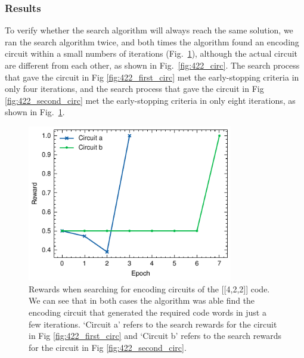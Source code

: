 \documentclass[a4paper,onecolumn,11pt]{quantumarticle}
\begin{document}
\subsubsection{Results}
To verify whether the search algorithm will always reach the same solution, we ran the search algorithm twice, and both times the algorithm found an encoding circuit within a small numbers of iterations (Fig.~\ref{fig:422_reward}), although the actual circuit are different from each other, as shown in Fig.~\ref{fig:422_circ}. The search process that gave the circuit in Fig \ref{fig:422_first_circ} met the early-stopping criteria in only four iterations, and the search process that gave the circuit in Fig \ref{fig:422_second_circ} met the early-stopping criteria in only eight iterations, as shown in Fig.~\ref{fig:422_reward}.
\begin{figure}[H]
    \centering
    \includegraphics[width=0.8\textwidth]{Figures/fig_422_rewards_1_2.pdf}
    \caption{Rewards when searching for encoding circuits of the [[4,2,2]] code. We can see that in both cases the algorithm was able find the encoding circuit that generated the required code words in just a few iterations. `Circuit a' refers to the search rewards for the circuit in Fig \ref{fig:422_first_circ} and `Circuit b' refers to the search rewards for the circuit in Fig \ref{fig:422_second_circ}.}\label{fig:422_reward}
\end{figure}
\end{document}
